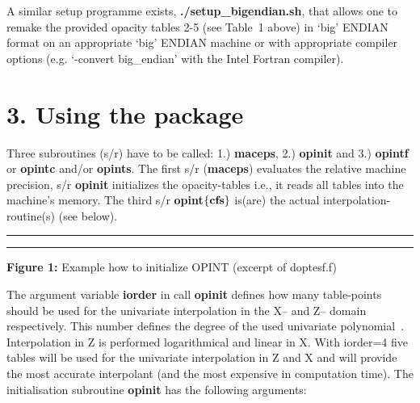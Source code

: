 A similar setup programme exists, {\bf ./setup\_bigendian.sh}, that allows one to 
remake the provided opacity tables 2-5 (see Table~1 above) in 
`big' ENDIAN format on an appropriate `big' ENDIAN machine or with appropriate 
compiler options (e.g. `-convert big\_endian' with the Intel Fortran compiler).
\vskip 8mm
\section{3. Using the package}
Three subroutines (s/r) have to be called: 1.) {\bf maceps}, 2.) {\bf opinit} 
and 3.) {\bf opintf} or {\bf opintc} and/or {\bf opints}. The first s/r
({\bf maceps}) evaluates the relative machine precision, 
s/r {\bf opinit} initializes the opacity-tables i.e., it reads
all tables into the machine's memory.  The third s/r {\bf opint$\{\bf cfs\}$} 
is(are) the actual interpolation-routine(s) (see below).
\bigskip
\hrule
\example
{}
\endexample
\bigskip
\hrule
\bigskip
\centerline{{\bf Figure 1:} Example how to initialize OPINT (excerpt of doptesf.f)}
\vskip 1cm
The argument variable {\bf iorder} in call {\bf opinit} defines how many 
table-points should be used
for the univariate interpolation in the X-- and Z-- domain respectively.
This number defines the degree of the used univariate polynomial~\cite{acm697}. 
Interpolation in Z is performed logarithmical and linear in X.
With iorder=4 five tables will be used for the univariate interpolation in
Z and X and will provide the most accurate interpolant (and the most expensive
in computation time).
\vskip 8mm
The initialisation subroutine {\bf opinit} has the following arguments:
\vskip 8mm

